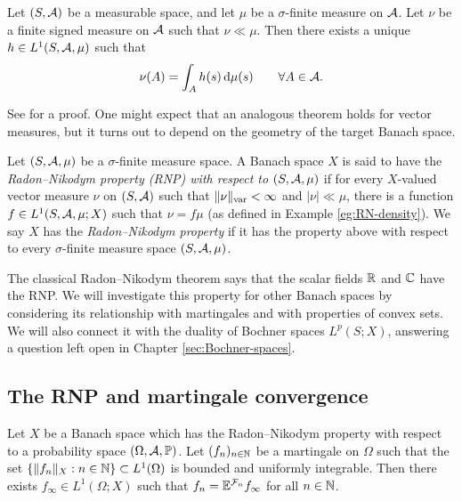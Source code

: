 \begin{thm}
  Let $(S,\mathcal{A})$ be a measurable space, and let $\mu$ be a $\sigma$-finite measure on $\mathcal{A}$.
  Let $\nu$ be a finite signed measure on $\mathcal{A}$ such that $\nu \ll \mu$.
  Then there exists a unique $h \in L^1(S,\mathcal{A},\mu)$ such that
  \begin{equation*}
    \nu(A) = \int_{A} h(s) \, \mathrm{d}\mu(s) \qquad \forall A \in \mathcal{A}.
  \end{equation*}
\end{thm}

See \cite[Theorem 5.5.4]{rD04} for a proof.
One might expect that an analogous theorem holds for vector measures, but it turns out to depend on the geometry of the target Banach space.

\begin{defn}
  Let $(S,\mathcal{A},\mu)$ be a $\sigma$-finite measure space.
  A Banach space $X$ is said to have the \emph{Radon--Nikodym property (RNP) with respect to $(S,\mathcal{A},\mu)$} if for every $X$-valued vector measure $\nu$ on $(S,\mathcal{A})$ such that $\|\nu\|_{\mathrm{var}} < \infty$ and $|\nu| \ll \mu$, there is a function $f \in L^1(S,\mathcal{A},\mu;X)$ such that $\nu = f\mu$ (as defined in Example \ref{eg:RN-density}).
  We say $X$ has the \emph{Radon--Nikodym property} if it has the property above with respect to every $\sigma$-finite measure space $(S,\mathcal{A},\mu)$.
\end{defn}

The classical Radon--Nikodym theorem says that the scalar fields $\mathbb{R}$ and $\mathbb{C}$ have the RNP.
We will investigate this property for other Banach spaces by considering its relationship with martingales and with properties of convex sets.
We will also connect it with the duality of Bochner spaces $L^p(S;X)$, answering a question left open in Chapter \ref{sec:Bochner-spaces}.

\subsection{The RNP and martingale convergence}

\begin{thm}
  Let $X$ be a Banach space which has the Radon--Nikodym property with respect to a probability space $(\Omega,\mathcal{A},\mathbb{P})$.
  Let $(f_n)_{n \in \mathbb{N}}$ be a martingale on $\Omega$ such that the set $\{\|f_n\|_X : n \in \mathbb{N}\} \subset L^1(\Omega)$ is bounded and uniformly integrable.
  Then there exists $f_\infty \in L^1(\Omega;X)$ such that $f_n = \mathbb{E}^{\mathcal{F}_n} f_\infty$ for all $n \in \mathbb{N}$.
\end{thm}

